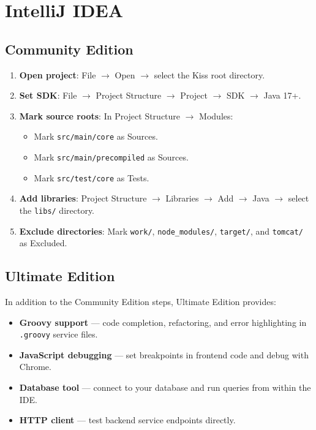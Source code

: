 \section{IntelliJ IDEA}
\label{sec:ide-intellij}

\subsection{Community Edition}

\begin{enumerate}
  \item \textbf{Open project}: File $\rightarrow$ Open $\rightarrow$ select the Kiss root directory.
  \item \textbf{Set SDK}: File $\rightarrow$ Project Structure $\rightarrow$ Project $\rightarrow$ SDK $\rightarrow$ Java 17+.
  \item \textbf{Mark source roots}: In Project Structure $\rightarrow$ Modules:
  \begin{itemize}
    \item Mark \texttt{src/main/core} as Sources.
    \item Mark \texttt{src/main/precompiled} as Sources.
    \item Mark \texttt{src/test/core} as Tests.
  \end{itemize}
  \item \textbf{Add libraries}: Project Structure $\rightarrow$ Libraries $\rightarrow$ Add $\rightarrow$ Java $\rightarrow$ select the \texttt{libs/} directory.
  \item \textbf{Exclude directories}: Mark \texttt{work/}, \texttt{node\_modules/}, \texttt{target/}, and \texttt{tomcat/} as Excluded.
\end{enumerate}

\subsection{Ultimate Edition}

In addition to the Community Edition steps, Ultimate Edition provides:

\begin{itemize}
  \item \textbf{Groovy support} --- code completion, refactoring, and error highlighting in \texttt{.groovy} service files.
  \item \textbf{JavaScript debugging} --- set breakpoints in frontend code and debug with Chrome.
  \item \textbf{Database tool} --- connect to your database and run queries from within the IDE.
  \item \textbf{HTTP client} --- test backend service endpoints directly.
\end{itemize}

